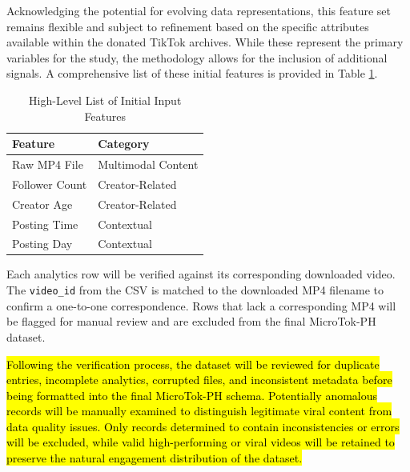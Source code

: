 Acknowledging the potential for evolving data representations, this feature set remains flexible and subject to refinement based on the specific attributes available within the donated TikTok archives. While these represent the primary variables for the study, the methodology allows for the inclusion of additional signals. A comprehensive list of these initial features is provided in Table \ref{tab:feature_list}.

\begin{table}[H]
    \centering
    \begin{tabular}{ll}
        \toprule
        \textbf{Feature}  & \textbf{Category} \\
        \midrule
        Raw MP4 File  & Multimodal Content \\
        Follower Count  & Creator-Related \\
        Creator Age  & Creator-Related \\
        Posting Time  & Contextual \\
        Posting Day  & Contextual \\
        \bottomrule
    \end{tabular}
    \caption{High-Level List of Initial Input Features}
    \label{tab:feature_list}
\end{table}

Each analytics row will be verified against its corresponding downloaded video. The \texttt{video\_id} from the CSV is matched to the downloaded MP4 filename to confirm a one-to-one correspondence. Rows that lack a corresponding MP4 will be flagged for manual review and are excluded from the final MicroTok-PH dataset.

\hl{Following the verification process, the dataset will be reviewed for duplicate entries, incomplete analytics, corrupted files, and inconsistent metadata before being formatted into the final MicroTok-PH schema. Potentially anomalous records will be manually examined to distinguish legitimate viral content from data quality issues. Only records determined to contain inconsistencies or errors will be excluded, while valid high-performing or viral videos will be retained to preserve the natural engagement distribution of the dataset.}

